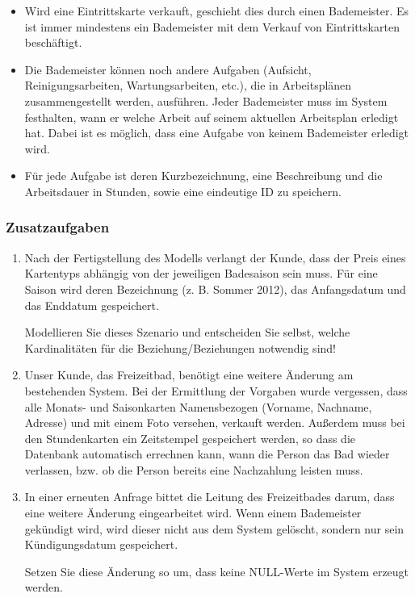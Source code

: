 \begin{itemize}
            \item Wird eine Eintrittskarte verkauft, geschieht dies durch einen Bademeister. Es ist immer mindestens ein Bademeister mit dem Verkauf von Eintrittskarten beschäftigt.
\clearpage
            \item Die Bademeister können noch andere Aufgaben (Aufsicht, Reinigungsarbeiten,
            Wartungsarbeiten, etc.), die in Arbeitsplänen zusammengestellt werden, ausführen. Jeder Bademeister muss im System festhalten, wann er welche Arbeit auf seinem aktuellen Arbeitsplan erledigt hat. Dabei ist es möglich, dass eine Aufgabe von keinem Bademeister erledigt wird.
            \item Für jede Aufgabe ist deren Kurzbezeichnung, eine Beschreibung und die
            Arbeitsdauer in Stunden, sowie eine eindeutige ID zu speichern.
          \end{itemize}

        \subsubsection{Zusatzaufgaben}
          \begin{enumerate} %
            \item Nach der Fertigstellung des Modells verlangt der Kunde, dass der Preis eines
            Kartentyps abhängig von der jeweiligen Badesaison sein muss. Für eine Saison wird deren
            Bezeichnung (z. B. Sommer 2012), das Anfangsdatum und das Enddatum gespeichert.

            Modellieren Sie dieses Szenario und entscheiden Sie selbst, welche Kardinalitäten für die
            Beziehung/Beziehungen notwendig sind!

            \item Unser Kunde, das Freizeitbad, benötigt eine weitere Änderung am bestehenden System.
            Bei der Ermittlung der Vorgaben wurde vergessen, dass alle Monats- und Saisonkarten
            Namensbezogen (Vorname, Nachname, Adresse) und mit einem Foto versehen, verkauft werden.
            Auß{}erdem muss bei den Stundenkarten ein Zeitstempel gespeichert werden, so dass die
            Datenbank automatisch errechnen kann, wann die Person das Bad wieder verlassen, bzw. ob die
            Person bereits eine Nachzahlung leisten muss.

            \item In einer erneuten Anfrage bittet die Leitung des Freizeitbades darum, dass eine weitere
            Änderung eingearbeitet wird. Wenn einem Bademeister gekündigt wird, wird dieser nicht aus
            dem System gelöscht, sondern nur sein Kündigungsdatum gespeichert.

            Setzen Sie diese Änderung so um, dass keine NULL-Werte im System erzeugt werden.
          \end{enumerate}%
\clearpage
